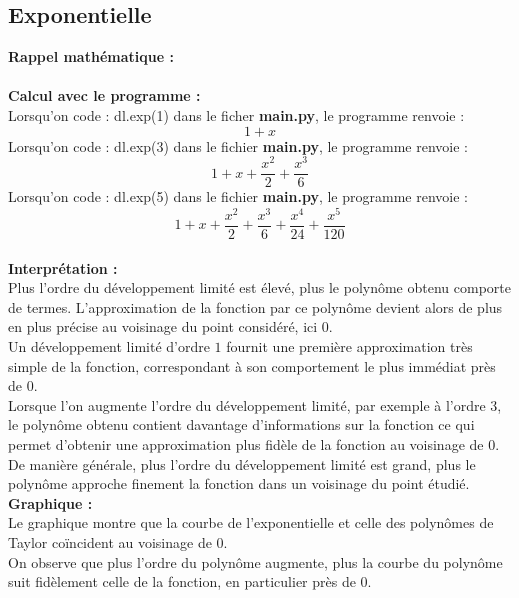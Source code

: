 \documentclass{article}
\begin{document}
\subsection{Exponentielle}
\textbf{Rappel mathématique : } \\
\\

\textbf{Calcul avec le programme :} \\

Lorsqu'on code : dl.exp(1) dans le ficher \textbf{main.py}, le programme renvoie : $$ 1+x$$
Lorsqu'on code : dl.exp(3) dans le fichier \textbf{main.py}, le programme renvoie : $$ 1+x+\frac{x^2}{2}+\frac{x^3}{6} $$
Lorsqu'on code : dl.exp(5) dans le fichier \textbf{main.py}, le programme renvoie : $$1+x+\frac{x^2}{2}+\frac{x^3}{6}+\frac{x^4}{24}+\frac{x^5}{120}$$ \\
\textbf{Interprétation :} \\
Plus l’ordre du développement limité est élevé, plus le polynôme obtenu comporte de termes. L’approximation de la fonction par ce polynôme devient alors de plus en plus précise au voisinage du point considéré, ici $0$. \\
Un développement limité d’ordre $1$ fournit une première approximation très simple de la fonction, correspondant à son comportement le plus immédiat près de $0$. \\

Lorsque l’on augmente l’ordre du développement limité, par exemple à l’ordre $3$, le polynôme obtenu contient davantage d’informations sur la fonction ce qui permet d’obtenir une approximation plus fidèle de la fonction au voisinage de $0$. \\

De manière générale, plus l’ordre du développement limité est grand, plus le polynôme approche finement la fonction dans un voisinage du point étudié. \\

\textbf{Graphique : } \\

Le graphique montre que la courbe de l’exponentielle et celle des polynômes de Taylor coïncident au voisinage de 0. \\

On observe que plus l’ordre du polynôme augmente, plus la courbe du polynôme suit fidèlement celle de la fonction, en particulier près de 0.\\
\end{document}
